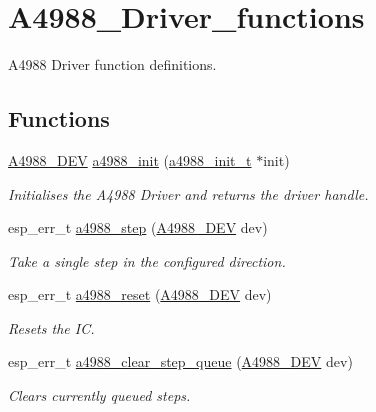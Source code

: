 \hypertarget{group__A4988__Driver__functions}{}\section{A4988\+\_\+\+Driver\+\_\+functions}
\label{group__A4988__Driver__functions}


A4988 Driver function definitions.  


\subsection*{Functions}
\begin{DoxyCompactItemize}
\item 
\hyperlink{group__A4988__definitions_ga16590a9dd79ad8fcf4c317be2659b6c5}{A4988\+\_\+\+D\+EV} \hyperlink{group__A4988__Driver__functions_ga169b52420965fa29fa24319c932234e0}{a4988\+\_\+init} (\hyperlink{group__A4988__definitions_gac5bf19333196aea92a3ab2fa176b7f65}{a4988\+\_\+init\+\_\+t} $\ast$init)
\begin{DoxyCompactList}\small\item\em Initialises the A4988 Driver and returns the driver handle. \end{DoxyCompactList}\item 
esp\+\_\+err\+\_\+t \hyperlink{group__A4988__Driver__functions_ga828d80809d008442cf283598778053e0}{a4988\+\_\+step} (\hyperlink{group__A4988__definitions_ga16590a9dd79ad8fcf4c317be2659b6c5}{A4988\+\_\+\+D\+EV} dev)
\begin{DoxyCompactList}\small\item\em Take a single step in the configured direction. \end{DoxyCompactList}\item 
esp\+\_\+err\+\_\+t \hyperlink{group__A4988__Driver__functions_ga8841dcdeca8a2b9ae13f3e8e1a63884c}{a4988\+\_\+reset} (\hyperlink{group__A4988__definitions_ga16590a9dd79ad8fcf4c317be2659b6c5}{A4988\+\_\+\+D\+EV} dev)
\begin{DoxyCompactList}\small\item\em Resets the IC. \end{DoxyCompactList}\item 
esp\+\_\+err\+\_\+t \hyperlink{group__A4988__Driver__functions_gaa96b4dada68f3d5b054310e629b7fcdb}{a4988\+\_\+clear\+\_\+step\+\_\+queue} (\hyperlink{group__A4988__definitions_ga16590a9dd79ad8fcf4c317be2659b6c5}{A4988\+\_\+\+D\+EV} dev)
\begin{DoxyCompactList}\small\item\em Clears currently queued steps. \end{DoxyCompactList}\item 

\end{DoxyCompactItemize}
